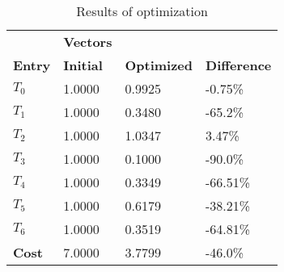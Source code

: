 \begin{table}[h!]
\centering
\begin{tabular}{llll}
\textbf{}      & \cellcolor[HTML]{EFEFEF}\textbf{Vectors} & \textbf{} & \textbf{}         \\
\rowcolor[HTML]{EFEFEF} 
\textbf{Entry} & \textbf{Initial} & \textbf{Optimized} & \textbf{Difference} \\
$T_0$ & 1.0000 & 0.9925 & -0.75\% \\ 
$T_1$ & 1.0000 & 0.3480 & -65.2\% \\ 
$T_2$ & 1.0000 & 1.0347 & 3.47\% \\ 
$T_3$ & 1.0000 & 0.1000 & -90.0\% \\ 
$T_4$ & 1.0000 & 0.3349 & -66.51\% \\ 
$T_5$ & 1.0000 & 0.6179 & -38.21\% \\ 
$T_6$ & 1.0000 & 0.3519 & -64.81\% \\ 
\rowcolor[HTML]{EFEFEF} 
\textbf{Cost}  & 7.0000 & 3.7799 & -46.0\% \\ 
\end{tabular}
\caption{Results of optimization}
\label{tab:OptimizationAnalysis}
\end{table}